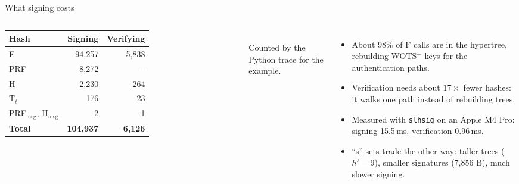 \documentclass[aspectratio=169,11pt]{beamer}
\begin{document}
\begin{frame}{What signing costs}
  \begin{columns}[T]
    \centering
    \begin{tabular}{@{}l r r@{}}
      \toprule
      Hash & Signing & Verifying \\
      \midrule
      F & 94,257 & 5,838 \\
      PRF & 8,272 & -- \\
      H & 2,230 & 264 \\
      T$_\ell$ & 176 & 23 \\
      PRF$_{\text{msg}}$, H$_{\text{msg}}$ & 2 & 1 \\
      \midrule
      \textbf{Total} & \textbf{104,937} & \textbf{6,126} \\
      \bottomrule
    \end{tabular}\\[1mm]
    \footnotesize\textcolor{quiet}{Counted by the Python trace for the example.}
    \small
    \begin{itemize}
      \item About 98\% of F calls are in the hypertree, rebuilding WOTS$^+$ keys for the authentication paths.
      \item Verification needs about $17\times$ fewer hashes: it walks one path instead of rebuilding trees.
      \item Measured with \texttt{slhsig} on an Apple M4 Pro: signing 15.5\,ms, verification 0.96\,ms.
      \item ``s'' sets trade the other way: taller trees ($h'=9$), smaller signatures (7,856 B), much slower signing.
    \end{itemize}
  \end{columns}
\end{frame}
\end{document}
